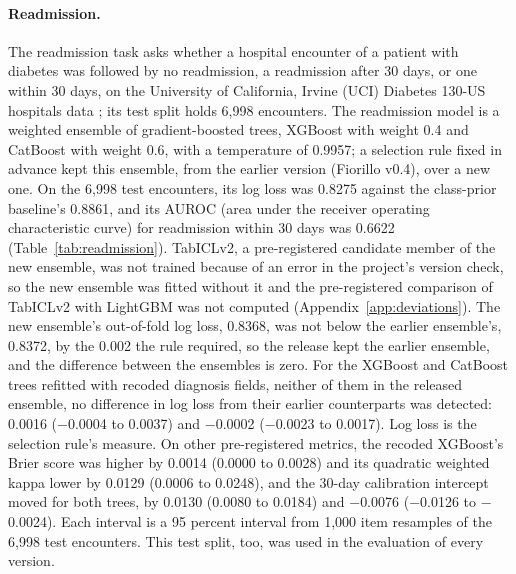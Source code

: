 \documentclass[11pt,letterpaper]{article}
\begin{document}
\paragraph{Readmission.} The readmission task asks whether a hospital encounter of a patient with diabetes was followed by no readmission, a readmission after 30 days, or one within 30 days, on the University of California, Irvine (UCI) Diabetes 130-US hospitals data \citep[CC BY 4.0;][]{strack2014}; its test split holds 6,998 encounters. The readmission model is a weighted ensemble of gradient-boosted trees, XGBoost \citep{chen2016} with weight 0.4 and CatBoost \citep{prokhorenkova2018} with weight 0.6, with a temperature of 0.9957; a selection rule fixed in advance kept this ensemble, from the earlier version (Fiorillo v0.4), over a new one. On the 6,998 test encounters, its log loss was 0.8275 against the class-prior baseline's 0.8861, and its AUROC (area under the receiver operating characteristic curve) for readmission within 30 days was 0.6622 (Table~\ref{tab:readmission}). TabICLv2, a pre-registered candidate member of the new ensemble, was not trained because of an error in the project's version check, so the new ensemble was fitted without it and the pre-registered comparison of TabICLv2 with LightGBM \citep{ke2017} was not computed (Appendix~\ref{app:deviations}). The new ensemble's out-of-fold log loss, 0.8368, was not below the earlier ensemble's, 0.8372, by the 0.002 the rule required, so the release kept the earlier ensemble, and the difference between the ensembles is zero. For the XGBoost and CatBoost trees refitted with recoded diagnosis fields, neither of them in the released ensemble, no difference in log loss from their earlier counterparts was detected: 0.0016 ($-$0.0004 to 0.0037) and $-$0.0002 ($-$0.0023 to 0.0017). Log loss is the selection rule's measure. On other pre-registered metrics, the recoded XGBoost's Brier score was higher by 0.0014 (0.0000 to 0.0028) and its quadratic weighted kappa lower by 0.0129 (0.0006 to 0.0248), and the 30-day calibration intercept moved for both trees, by 0.0130 (0.0080 to 0.0184) and $-$0.0076 ($-$0.0126 to $-$0.0024). Each interval is a 95 percent interval from 1,000 item resamples of the 6,998 test encounters. This test split, too, was used in the evaluation of every version.

\begin{table}[H]
\centering\footnotesize
\caption{PubMedQA, the 500 expert-labeled test items (this test split was used in the evaluation of every version, so these results are not confirmatory). Each cell gives the estimate and its 95 percent interval from 1,000 item resamples; ECE is the expected calibration error. BioGPT-Large-PubMedQA was fine-tuned on sets that hold all 150 validation items, so its uncalibrated probabilities are its primary result and its calibration on those items is secondary.}
\label{tab:pubmedqa}

\end{table}
\end{document}

